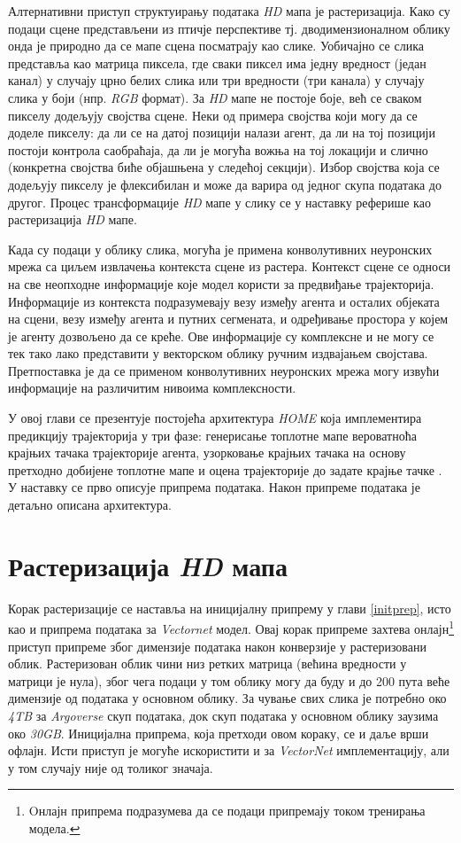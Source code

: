 \documentclass[11pt,oneside]{memoir}
\begin{document}
Алтернативни приступ структуирању података \textit{HD} мапа је растеризација. Како су подаци
сцене представљени из птичје перспективе тј. дводимензионалном облику онда је природно да се мапе сцена посматрају као слике. 
Уобичајно се слика представља као матрица пиксела, где сваки пиксел има једну вредност (један канал) у случају црно белих слика или 
три вредности (три канала) у случају слика у боји (нпр. \textit{RGB} формат). За \textit{HD}
мапе не постоје боје, већ се сваком пикселу додељују својства сцене. Неки од примера својства који могу 
да се доделе пикселу: да ли се на датој позицији налази агент,
да ли на тој позицији постоји контрола саобраћаја, да ли је могућа вожња на тој локацији и слично (конкретна својства
биће објашњена у следећој секцији). Избор својства која се додељују
пикселу је флексибилан и може да варира од једног скупа података до другог.
Процес трансформације \textit{HD} мапе у слику се у наставку реферише као растеризација \textit{HD} мапе. 

Када су подаци у облику слика, могућа је примена конволутивних неуронских мрежа са циљем извлачења контекста сцене из растера. 
Контекст сцене се односи на све неопходне информације које модел користи за предвиђање трајекторија. Информације из контекста подразумевају
везу између агента и осталих објеката на сцени, везу између агента и путних сегмената, и одређивање простора у којем је агенту дозвољено да се креће.
Ове информације су комплексне и не могу се тек тако лако представити у векторском облику ручним издвајањем својстава. 
Претпоставка је да се применом конволутивних неуронских мрежа могу извући информације на различитим нивоима комплексности. 

У овој глави се презентује постојећа архитектура \textit{HOME} која имплементира предикцију трајекторија у три фазе: 
генерисање топлотне мапе вероватноћа крајњих тачака трајекторије агента, 
узорковање крајњих тачака на основу претходно добијене топлотне мапе и оцена трајекторије до задате крајње
тачке \cite{home}. У наставку се прво описује припрема података. Након припреме података је детаљно описана архитектура.

\section{Растеризација \textit{HD} мапа}

Корак растеризације се наставља на иницијалну припрему у глави \ref{initprep}, исто као и припрема података за \textit{Vectornet} модел. 
Овај корак припреме захтева онлајн\footnote{Oнлајн припрема подразумева да се подаци припремају током тренирања модела.} 
приступ припреме због димензије података након конверзије у растеризовани облик. Растеризован облик чини
низ ретких матрица (већина вредности у матрици је нула), због чега подаци у том облику могу да буду 
и до 200 пута веће димензије од података у основном облику. За чување 
свих слика је потребно око \textit{4TB} за \textit{Argoverse} скуп података, 
док скуп података у основном облику заузима око \textit{30GB}. Иницијална
припрема, која претходи овом кораку, се и даље врши офлајн. 
Исти приступ је могуће искористити и за \textit{VectorNet} имплементацију, али у том случају није од толиког значаја. 
\end{document}
